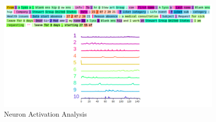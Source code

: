 \begin{figure}[h] 
    \includegraphics[width=\textwidth]{images/Screenshot from 2022-11-28 15-26-01.png}
    \caption{Neuron Activation Analysis}
    \label{fig:Neuron_Activation_Analysis}
\end{figure}    


